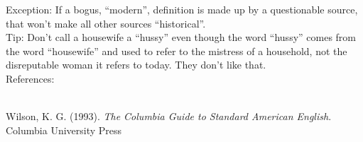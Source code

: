 \documentclass[a4paper,12pt,single,pdftex]{scrartcl}
\begin{document}
    
      Exception: If a bogus, “modern”, definition is made up by a questionable source, that won’t make all other sources “historical”.
    \\

    
      Tip: Don’t call a housewife a “hussy” even though the word “hussy” comes from the word “housewife” and used to refer to the mistress of a household, not the disreputable woman it refers to today. They don’t like that.
    \\

    References:

    
      
        
      \\

      
        
          Wilson, K. G. (1993). {\it The Columbia Guide to Standard American English}. Columbia University Press
        
      
    
\end{document}

